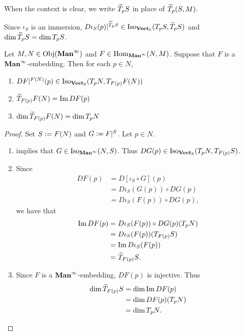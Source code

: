 \documentclass{book}
\begin{document}
	\begin{note}
		When the context is clear, we write $\widetilde{T}_p S$ in place of $\widetilde{T}_p (S, M)$.
	\end{note}
	
	

	\begin{note}
		Since $\iota_S$ is an immersion, $D\iota_S(p)|^{\widetilde{T}_pS} \in \operatorname{Iso}_{\operatorname*{\text{\textbf{Vect}}_{\mathbb{R}}}}(T_pS, \widetilde{T}_pS)$ and $\dim \widetilde{T}_p S = \dim T_pS$.
	\end{note}

	\begin{ex} 
		Let $M, N \in \operatorname{Obj}(\operatorname*{\text{\textbf{Man}}^{\infty}})$ and $F \in \operatorname{Hom}_{\operatorname*{\text{\textbf{Man}}^{\infty}}}(N, M)$. Suppose that $F$ is a $\operatorname*{\text{\textbf{Man}}^{\infty}}$-embedding. Then for each $p \in N$,
		\begin{enumerate}
			\item $DF|^{F(N)}(p) \in \operatorname{Iso}_{\operatorname*{\text{\textbf{Vect}}_{\mathbb{R}}}}(T_pN, T_{F(p)}F(N))$
			\item $\widetilde{T}_{F(p)}F(N) = \text{Im} \, DF(p)$
			\item $\dim \widetilde{T}_{F(p)}F(N) = \dim T_p N$
		\end{enumerate}
	\end{ex}

	\begin{proof}
		Set $S \vcentcolon= F(N)$ and $G \vcentcolon= F|^S$. Let $p \in N$.
		\begin{enumerate}
			\item {} implies that $G \in \operatorname{Iso}_{\operatorname*{\text{\textbf{Man}}^{\infty}}}(N, S)$. Thus $DG(p) \in \operatorname{Iso}_{\operatorname*{\text{\textbf{Vect}}_{\mathbb{R}}}}(T_pN, T_{F(p)}S)$.
			\item Since 
			\begin{align*}
				DF(p)
				& = D[\iota_S \circ G](p) \\
				& = D \iota_S(G(p)) \circ DG(p) \\
				& = D \iota_S(F(p)) \circ DG(p),
			\end{align*}
			we have that 
			\begin{align*}
				\text{Im} \, DF(p)
				& = D \iota_S(F(p)) \circ DG(p)(T_pN) \\
				& = D \iota_S(F(p))(T_{F(p)}S) \\
				& = \text{Im} \, D \iota_S(F(p)) \\
				& = \widetilde{T}_{F(p)}S.
			\end{align*}
			\item Since $F$ is a $\operatorname*{\text{\textbf{Man}}^{\infty}}$-embedding, $DF(p)$ is injective. Thus 
			\begin{align*}
				\dim \widetilde{T}_{F(p)}S
				& = \dim \text{Im} \, DF(p) \\
				& = \dim DF(p)(T_p N) \\
				& = \dim T_pN. 
			\end{align*}
		\end{enumerate}
	\end{proof}
	
\end{document}
